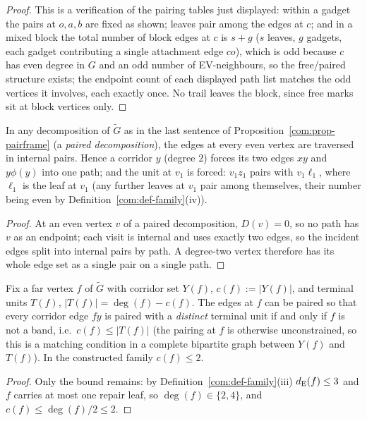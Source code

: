 \begin{proof}
This is a verification of the pairing tables just displayed: within a
gadget the pairs at $o,a,b$ are fixed as shown; leaves pair among the
edges at $c$; and in a mixed block the total number of block edges at $c$
is $s+g$ ($s$ leaves, $g$ gadgets, each gadget contributing a single
attachment edge $co$), which is odd because $c$ has even degree in $G$
and an odd number of EV-neighbours, so the free/paired structure exists;
the endpoint count of each displayed path list matches the odd vertices
it involves, each exactly once. No trail leaves the block, since free
marks sit at block vertices only.
\end{proof}

\begin{lemma}\label{com:lem-fuse}
In any decomposition of $\tilde G$ as in the last sentence of
Proposition~\ref{com:prop-pairframe} (a \emph{paired decomposition}), the
edges at every even vertex are traversed in internal pairs. Hence a
corridor $y$ (degree $2$) forces its two edges $xy$ and $y\phi(y)$ into
one path; and the unit at $v_1$ is forced: $v_1z_1$ pairs with
$v_1\ell_1$, where $\ell_1$ is the leaf at $v_1$ (any further leaves at
$v_1$ pair among themselves, their number being even by
Definition~\ref{com:def-family}(iv)).
\end{lemma}

\begin{proof}
At an even vertex $v$ of a paired decomposition, $D(v)=0$, so no path has
$v$ as an endpoint; each visit is internal and uses exactly two edges, so
the incident edges split into internal pairs by path. A degree-two vertex
therefore has its whole edge set as a single pair on a single path.
\end{proof}

\begin{proposition}\label{com:prop-inject}
Fix a far vertex $f$ of $\tilde G$ with corridor set $Y(f)$, $c(f):=|Y(f)|$,
and terminal units $T(f)$, $|T(f)|=\deg(f)-c(f)$. The edges at $f$ can be
paired so that every corridor edge $fy$ is paired with a \emph{distinct}
terminal unit if and only if $f$ is not a band, i.e.\ $c(f)\le|T(f)|$ (the
pairing at $f$ is otherwise unconstrained, so this is a matching condition
in a complete bipartite graph between $Y(f)$ and $T(f)$). In the
constructed family $c(f)\le2$.
\end{proposition}

\begin{proof}
Only the bound remains: by Definition~\ref{com:def-family}(iii)
$d_{\mathrm{E}}(f)\le3$ and $f$ carries at most one repair leaf, so
$\deg(f)\in\{2,4\}$, and $c(f)\le\deg(f)/2\le2$.
\end{proof}

